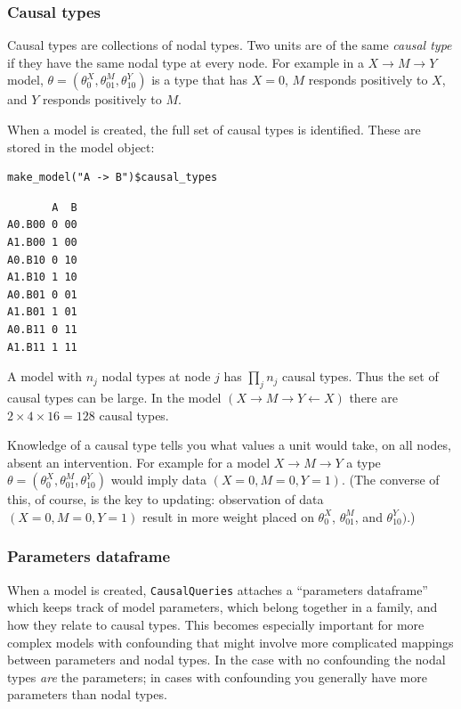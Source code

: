 \documentclass[
  article]{jss}
\begin{document}
\hypertarget{causal-types}{%
\subsubsection{Causal types}\label{causal-types}}

Causal types are collections of nodal types. Two units are of the same
\emph{causal type} if they have the same nodal type at every node. For
example in a \(X \rightarrow M \rightarrow Y\) model,
\(\theta = (\theta^X_0, \theta^M_{01}, \theta^Y_{10})\) is a type that
has \(X=0\), \(M\) responds positively to \(X\), and \(Y\) responds
positively to \(M\).

When a model is created, the full set of causal types is identified.
These are stored in the model object:

\begin{verbatim}
make_model("A -> B")$causal_types
\end{verbatim}

\begin{verbatim}
       A  B
A0.B00 0 00
A1.B00 1 00
A0.B10 0 10
A1.B10 1 10
A0.B01 0 01
A1.B01 1 01
A0.B11 0 11
A1.B11 1 11
\end{verbatim}

A model with \(n_j\) nodal types at node \(j\) has \(\prod_jn_j\) causal
types. Thus the set of causal types can be large. In the model
\((X\rightarrow M \rightarrow Y \leftarrow X)\) there are
\(2\times 4\times 16 = 128\) causal types.

Knowledge of a causal type tells you what values a unit would take, on
all nodes, absent an intervention. For example for a model
\(X \rightarrow M \rightarrow Y\) a type
\(\theta = (\theta^X_0, \theta^M_{01}, \theta^Y_{10})\) would imply data
\((X=0, M=0, Y=1)\). (The converse of this, of course, is the key to
updating: observation of data \((X=0, M=0, Y=1)\) result in more weight
placed on \(\theta^X_0\), \(\theta^M_{01}\), and \(\theta^Y_{10})\).)

\hypertarget{parameters-dataframe}{%
\subsubsection{Parameters dataframe}\label{parameters-dataframe}}

When a model is created, \texttt{CausalQueries} attaches a ``parameters
dataframe'' which keeps track of model parameters, which belong together
in a family, and how they relate to causal types. This becomes
especially important for more complex models with confounding that might
involve more complicated mappings between parameters and nodal types. In
the case with no confounding the nodal types \emph{are} the parameters;
in cases with confounding you generally have more parameters than nodal
types.
\end{document}
